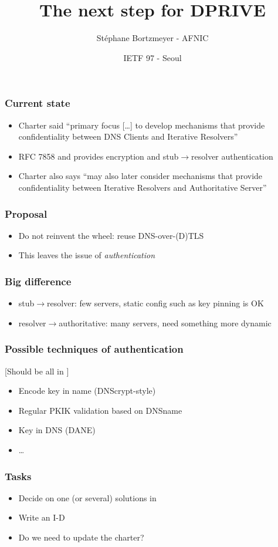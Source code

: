 \documentclass[ignorenonframetext]{beamer}
\title{The next step for DPRIVE}
\author{Stéphane Bortzmeyer - AFNIC}
\date{IETF 97 - Seoul}
\begin{document}
\begin{frame}
\maketitle  
\end{frame}

\begin{frame}
  \frametitle{Current state}
  \begin{itemize}
  \item<2->Charter said ``primary focus [\ldots] to develop mechanisms that
    provide confidentiality between DNS Clients and Iterative Resolvers''
   \item<3->RFC 7858 and
      provides
     encryption and stub$\longrightarrow$resolver authentication
  \item<4->Charter also says ``may also later consider mechanisms that provide confidentiality
between Iterative Resolvers and Authoritative Server''
  \end{itemize}
\end{frame}

\begin{frame}
  \frametitle{Proposal}
  \begin{itemize}
  \item<2->Do not reinvent the wheel: reuse DNS-over-(D)TLS
  \item<3->This leaves the issue of \emph{authentication}
  \end{itemize}
\end{frame}

\begin{frame}
  \frametitle{Big difference}
  \begin{itemize}
    \item<2->stub$\longrightarrow$resolver: few servers, static config
      such as key pinning is OK
    \item<3->resolver$\longrightarrow$authoritative: many servers,
      need something more dynamic
    \end{itemize}
\end{frame}

\begin{frame}
  \frametitle{Possible techniques of authentication}
             [Should be all in ]
   \begin{itemize}
   \item<2->Encode key in name (DNScrypt-style)
   \item<3->Regular PKIK validation based on DNSname
   \item<4->Key in DNS (DANE)
   \item<5->\ldots  
   \end{itemize}            
\end{frame}

\begin{frame}
  \frametitle{Tasks}
  \begin{itemize}
  \item<2->Decide on one (or several) solutions in
  \item<3->Write an I-D
  \item<4->Do we need to update the charter?  
  \end{itemize}
\end{frame}
\end{document}

